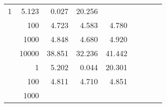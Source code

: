 \begin{table}
\begin{tabular}{rrrrrrrrr}
					\multirow{ 1 }{*}{ 1 } &
					
						
							    
							    
	                           5.123 & 0.027 & 20.256  \\
	                
	            
					 &  
					 
					\multirow{ 1 }{*}{ 100 } &
					
						
							    
							    
	                           4.723 & 4.583 & 4.780  \\
	                
	            
					 &  
					 
					\multirow{ 1 }{*}{ 1000 } &
					
						
							    
							    
	                           4.848 & 4.680 & 4.920  \\
	                
	            
					 &  
					 
					\multirow{ 1 }{*}{ 10000 } &
					
						
							    
							    
	                           38.851 & 32.236 & 41.442  \\
	                
	            
	        
				\noalign{\smallskip}\hline
				\multirow{ 4 }{*}{ 160000 } &
				
					
					 
					\multirow{ 1 }{*}{ 1 } &
					
						
							    
							    
	                           5.202 & 0.044 & 20.301  \\
	                
	            
					 &  
					 
					\multirow{ 1 }{*}{ 100 } &
					
						
							    
							    
	                           4.811 & 4.710 & 4.851  \\
	                
	            
					 &  
					 
					\multirow{ 1 }{*}{ 1000 } &
					
						
							    

\end{tabular}
\end{table}
